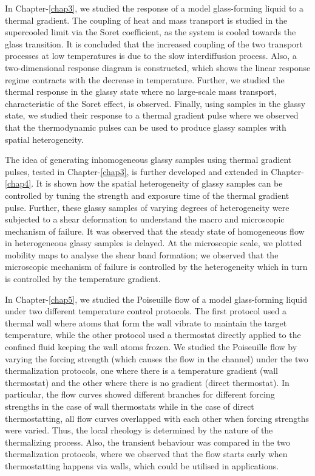 In Chapter-\ref{chap3}, we studied the response of a model glass-forming liquid to a thermal gradient. The coupling of heat and mass transport is studied in the supercooled limit via the Soret coefficient, as the system is cooled towards the glass transition. It is concluded that the increased coupling of the two transport processes at low temperatures is due to the slow interdiffusion process. Also, a two-dimensional response diagram is constructed, which shows the linear response regime contracts with the decrease in temperature. Further, we studied the thermal response in the glassy state where no large-scale mass transport, characteristic of the Soret effect, is observed. Finally, using samples in the glassy state, we studied their response to a thermal gradient pulse where we observed that the thermodynamic pulses can be used to produce glassy samples with spatial heterogeneity.

The idea of generating inhomogeneous glassy samples using thermal gradient pulses, tested in Chapter-\ref{chap3}, is further developed and extended in Chapter-\ref{chap4}. It is shown how the spatial heterogeneity of glassy samples can be controlled by tuning the strength and exposure time of the thermal gradient pulse. Further, these glassy samples of varying degrees of heterogeneity were subjected to a shear deformation to understand the macro and microscopic mechanism of failure. It was observed that the steady state of homogeneous flow in heterogeneous glassy samples is delayed. At the microscopic scale, we plotted mobility maps to analyse the shear band formation; we observed that the microscopic mechanism of failure is controlled by the heterogeneity which in turn is controlled by the temperature gradient.

In Chapter-\ref{chap5}, we studied the Poiseuille flow of a model glass-forming liquid under two different temperature control protocols. The first protocol used a thermal wall where atoms that form the wall vibrate to maintain  the target temperature, while the other protocol used a thermostat directly applied to the confined fluid keeping the wall atoms frozen. We studied the Poiseuille flow by varying the forcing strength (which causes the flow in the channel) under the two thermalization protocols, one where there is a temperature gradient (wall thermostat) and the other where there is no gradient (direct thermostat). In particular, the flow curves showed different branches for different forcing strengths in the case of wall thermostats while in the case of direct thermostatting, all flow curves overlapped with each other when forcing strengths were varied. Thus, the local rheology is determined by the nature of the thermalizing process. Also, the transient behaviour was compared in the two thermalization protocols, where we observed that the flow starts early when thermostatting happens via walls, which could be utilised in applications.

